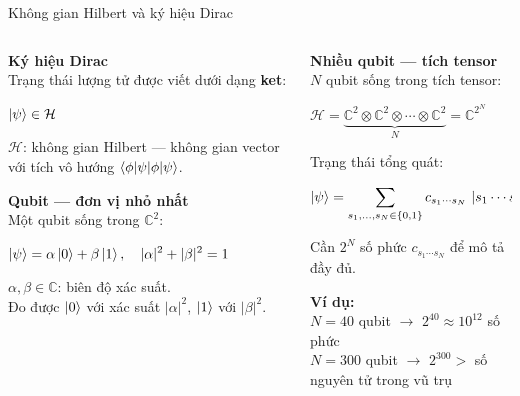 \documentclass[aspectratio=169, 11pt]{beamer}
\newcommand{\eqn}[1]{\begin{center}\colorbox{eqbox}{\color{qcyan}$\displaystyle #1$}\end{center}}
\begin{document}
\begin{frame}[shrink=3]{Không gian Hilbert và ký hiệu Dirac}

\begin{columns}[T]
\begin{column}{0.48\textwidth}

\textcolor{qcyan}{\textbf{Ký hiệu Dirac}}\\[3pt]
{\small Trạng thái lượng tử được viết dưới dạng \textbf{ket}:}
\eqn{\ket{\psi} \in \mathcal{H}}
{\small $\mathcal{H}$: không gian Hilbert — không gian vector với tích vô hướng $\braket{\phi|\psi}$.}

\vspace{6pt}
\textcolor{qcyan}{\textbf{Qubit — đơn vị nhỏ nhất}}\\[3pt]
{\small Một qubit sống trong $\mathbb{C}^2$:}
\eqn{\ket{\psi} = \alpha\ket{0} + \beta\ket{1}, \quad |\alpha|^2 + |\beta|^2 = 1}
{\small $\alpha, \beta \in \mathbb{C}$: biên độ xác suất.\\
Đo được $\ket{0}$ với xác suất $|\alpha|^2$, $\ket{1}$ với $|\beta|^2$.}

\end{column}
\begin{column}{0.48\textwidth}

\vspace{2pt}
\textcolor{qpurple}{\textbf{Nhiều qubit — tích tensor}}\\[3pt]
{\small $N$ qubit sống trong tích tensor:}
\eqn{\mathcal{H} = \underbrace{\mathbb{C}^2 \otimes \mathbb{C}^2 \otimes \cdots \otimes \mathbb{C}^2}_{N} = \mathbb{C}^{2^N}}

{\small Trạng thái tổng quát:}
\eqn{\ket{\psi} = \sum_{s_1,\ldots,s_N \in \{0,1\}} c_{s_1\cdots s_N}\,\ket{s_1 \cdots s_N}}
{\small Cần $2^N$ số phức $c_{s_1\cdots s_N}$ để mô tả đầy đủ.}

\vspace{6pt}
\textcolor{qamber}{\textbf{Ví dụ:}}\\[2pt]
{\small $N=40$ qubit $\to$ $2^{40} \approx 10^{12}$ số phức\\
$N=300$ qubit $\to$ $2^{300} >$ số nguyên tử trong vũ trụ}

\end{column}
\end{columns}

\end{frame}
\end{document}
